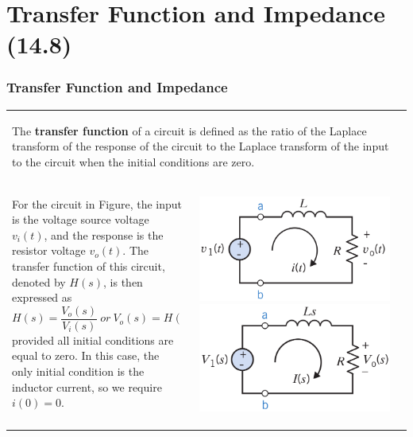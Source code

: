 \documentclass[aspectratio=169]{beamer}
\begin{document}
\section{Transfer Function and Impedance (14.8)}
\begin{frame}[fragile]
	\frametitle{Transfer Function and Impedance}
\begin{tabular}{ll}
	\begin{columns}
\footnotesize			\begin{column}{1\textwidth}  %
The \textbf{transfer function} of a circuit is defined as the ratio of the Laplace transform of the
response of the circuit to the Laplace transform of the input to the circuit when the initial
conditions are zero.
		\end{column}
		\end{columns}\\
		\begin{columns}
\footnotesize		\begin{column}{0.5\textwidth}  %
\newline \newline For the circuit in Figure, the input is the voltage source voltage $v_i(t)$, and the response is the
resistor voltage $v_o(t)$. The transfer function of this circuit, denoted by $H(s)$, is then expressed as
$$H(s)=\dfrac{V_o(s)}{V_i(s)} \ or  \ V_o(s)=H(s)V_i(s)$$
provided all initial conditions are equal to zero. In this case, the only initial condition is the inductor
current, so we require $i(0)=0$.
		\end{column}
		\begin{column}{0.5\textwidth}  %
\center		\includegraphics[height=2.2 cm]{figure21.png}
\center		\includegraphics[height=2.2 cm]{figure22.png}
		\end{column}
	\end{columns}\\
\end{tabular}
\end{frame}
\end{document}
